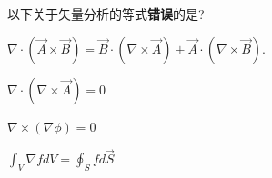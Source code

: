 \documentclass{njustexam}
\begin{document}





\begin{problem}
  以下关于矢量分析的等式\textbf{错误}的是? 
  \begin{abcd}
    \item $\nabla \cdot(\vec{A} \times \vec{B})=\vec{B} \cdot(\nabla \times \vec{A})
    +\vec{A} \cdot(\nabla \times \vec{B}).
$
    \item $\nabla \cdot (\nabla \times \vec{A}) = 0$
    \item $\nabla \times (\nabla \phi) = 0$
    \item $\int_V \nabla f d V=\oint_S f d \vec{S}$

  \end{abcd}
\end{problem}


\end{document}
